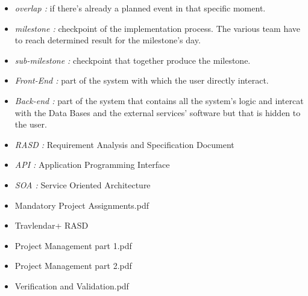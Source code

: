 \begin{itemize}
	\item \emph{overlap : } if there’s already a planned event in that specific moment.
	\item \emph{milestone : } checkpoint of the implementation process. The various team have to reach determined result for the milestone's day.
	\item \emph{sub-milestone : } checkpoint that together produce the milestone.
	\item \emph{Front-End : } part of the system with which the user directly interact.
	\item \emph{Back-end : } part of the system that contains all the system's logic and intercat with the Data Bases and the external services' software but that is hidden to the user.
\end{itemize}

\begin{itemize}
	\setlength{\leftskip}{0.5cm}
	\item \emph{RASD : }Requirement Analysis and Specification Document
	\item \emph{API : }Application Programming Interface
	\item \emph{SOA : }Service Oriented Architecture
\end{itemize}


\begin{itemize}
	\setlength{\leftskip}{0.5cm}
	\item Mandatory Project Assignments.pdf
	\item Travlendar+ RASD
	\item Project Management part 1.pdf
	\item Project Management part 2.pdf
	\item Verification and Validation.pdf
\end{itemize}


